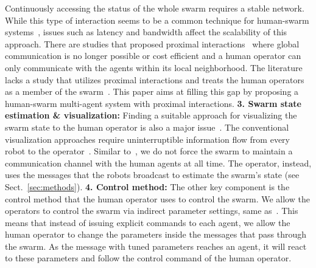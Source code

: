 \documentclass[runningheads]{llncs}%
\begin{document}
Continuously accessing the status of the whole swarm requires a stable network. While this type of interaction seems to be a common technique for human-swarm systems~\cite{levillain2018more,ashcraft2019moderating}, issues such as latency and bandwidth affect the scalability of this approach. There are studies that proposed proximal interactions~\cite{naghsh2008analysis,alboul2008mixed} where global communication is no longer possible or cost efficient and a human operator can only communicate with the agents within its local neighborhood. The literature lacks a study that utilizes proximal interactions and treats the human operators as a member of the swarm~\cite{adams2018swarm}. This paper aims at filling this gap by proposing a human-swarm multi-agent system with proximal interactions. %
\textbf{3. Swarm state estimation \& visualization:}
Finding a suitable approach for visualizing the swarm state to the human operator is also a major issue~\cite{tabibian2014towards,sycara2015abstraction}. The conventional visualization approaches require uninterruptible information flow from every robot to the operator~\cite{capelli2019communication}. Similar to~\cite{matsuka2019distributed,cain2019human}, we do not force the swarm to maintain a communication channel with the human agents at all time. The operator, instead, uses the messages that the robots broadcast to estimate the swarm's state (see Sect.~\ref{sec:methods}). 
\textbf{4. Control method:}
The other key component is the {control method} that the human operator uses to control the swarm. We allow the operators to control the swarm via indirect parameter settings, same as~\cite{hexmoor2005swarm,liu2019trust}. This means that instead of issuing explicit commands to each agent, we allow the human operator to change the parameters inside the messages that pass through the swarm. As the message with tuned parameters reaches an agent, it will react to these parameters and follow the control command of the human operator. 
\end{document}
